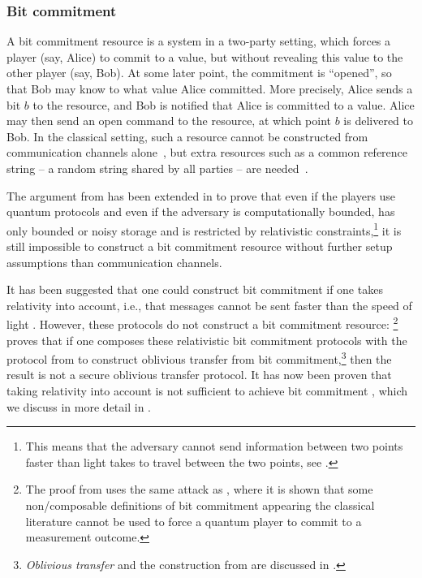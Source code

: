\subsubsection{Bit commitment}
\label{sec:mpc.BC}

A bit commitment resource is a system in a two-party setting, which
forces a player (say, Alice) to commit to a value, but without
revealing this value to the other player (say, Bob). At some later
point, the commitment is ``opened'', so that Bob may know to what
value Alice committed. More precisely, Alice sends a bit $b$ to the
resource, and Bob is notified that Alice is committed to a
value. Alice may then send an open command to the resource, at which
point $b$ is delivered to Bob. In the classical setting, such a
resource cannot be constructed from communication channels
alone~\cite{CF01,MR11}, but extra resources such as a common reference
string \--- a random string shared by all parties \--- are
needed~\cite{CF01}.

The argument from \textcite{MR11} has been extended in
\textcite{VPdR19} to prove that even if the players use quantum
protocols and even if the adversary is computationally bounded, has
only bounded or noisy storage and is restricted by relativistic
constraints,\footnote{This means that the adversary cannot send
  information between two points faster than light takes to travel
  between the two points, see .} it is still
impossible to construct a bit commitment resource without further
setup assumptions than communication channels.

It has been suggested that one could construct bit commitment if one
takes relativity into account, i.e., that messages cannot be sent
faster than the speed of light \cite{Ken99,Ken12,KTHW13}. However,
these protocols do not construct a bit commitment resource:
\textcite[Appendix A]{Kan15}\footnote{The proof from
  \textcite[Appendix A]{Kan15} uses the same attack as
  \textcite{BCMS98}, where it is shown that some non\-/composable
  definitions of bit commitment appearing the classical literature
  cannot be used to force a quantum player to commit to a measurement
  outcome.} proves that if one composes these relativistic bit
commitment protocols with the protocol from \textcite{Unr10} to
construct oblivious transfer from bit
commitment,\footnote{\emph{Oblivious transfer} and the construction
  from \textcite{Unr10} are discussed in .} then
the result is not a secure oblivious transfer protocol. It has now
been proven that taking relativity into account is not sufficient to
achieve bit commitment \cite{VPdR19}, which we discuss in more detail
in .


